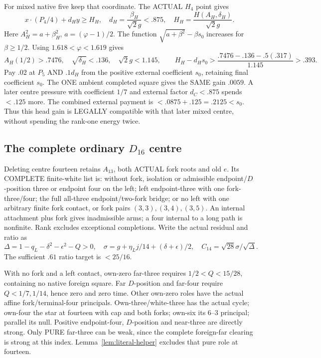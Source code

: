 \documentclass[11pt]{article}
\begin{document}
For mixed native five keep that coordinate.
The ACTUAL \(H_4\) point gives
\[
 x\cdot(P_4/4)+d_Hy\ge H_H,\quad
 d_H={\frac{\beta_H}{\sqrt2g}}<.875,\quad
 H_H={\frac{H(A_H,\delta_H)}{\sqrt2g}}.
\]
Here \(A_H^2=a+\beta_H^2\),
\(a=(\varphi-1)/2\).
The function
\(\sqrt{a+\beta^2}-\beta s_0\)
increases for \(\beta\ge1/2\).
Using \(1.618<\varphi<1.619\) gives
\[
 A_H(1/2)>.7476,\quad\sqrt{\delta_H}<.136,\quad
 \sqrt2g<1.145,\qquad
 H_H-d_Hs_0>{\frac{.7476-.136-.5(.317)}{1.145}}>.393 .
\]
Pay \(.02\) at \(P_5\) AND \(.1d_H\)
from the positive external coefficient
\(s_0\), retaining final coefficient \(s_0\).
The ONE ambient completed square gives
the SAME gain \(.0059\).
A later centre pressure with coefficient
\(1/7\) and external factor \(d_C<.875\)
spends \(<.125\) more.
The combined external payment is
\(<.0875+.125=.2125<s_0\).
Thus this head gain is LEGALLY compatible
with that later mixed centre, without
spending the rank-one energy twice.

\subsection[The complete ordinary D16 centre]{The complete ordinary \(D_{16}\) centre}
\label{app:arithD16ordinarycentre}

Deleting centre fourteen retains \(A_{13}\),
both ACTUAL fork roots and old \(e\).
Its COMPLETE finite-white list is:
without fork, isolation or admissible
endpoint/\(D\)-position three or endpoint
four on the left;
left endpoint-three with one fork-three/four;
the full all-three endpoint/two-fork bridge;
or no left with one arbitrary finite fork
contact, or fork pairs
\((3,3),(3,4),(3,5)\).
An internal attachment plus fork gives
inadmissible arms; a four internal to
a long path is nonfinite.
Rank excludes exceptional completions.
Write the actual residual and ratio as
\[
 \Delta=1-q_L-\delta^2-\epsilon^2-Q>0,\quad
 \sigma=g+\eta_Lj/14+(\delta+\epsilon)/2,\quad
                              C_{14}=\sqrt{28}\sigma/\sqrt\Delta .
\]
The sufficient \(.61\) ratio target is
\(<25/16\).

With no fork and a left contact,
own-zero far-three requires
\(1/2<Q<15/28\), containing no native
foreign square.
Far \(D\)-position and far-four require
\(Q<1/7,1/14\), hence zero and zero
time.  Other own-zero roles have
the actual affine fork/terminal-four
principals.
Own-three/white-three has the actual
cycle; own-four the star at fourteen
with cap and both forks; own-six its
\(6\)--\(3\) principal; parallel its null.
Positive endpoint-four, \(D\)-position
and near-three are directly strong.
Only PURE far-three can be weak, since
the complete foreign-far clearing is
strong at this index.
Lemma~\ref{lem:literal-helper} excludes
that pure role at fourteen.
\end{document}
